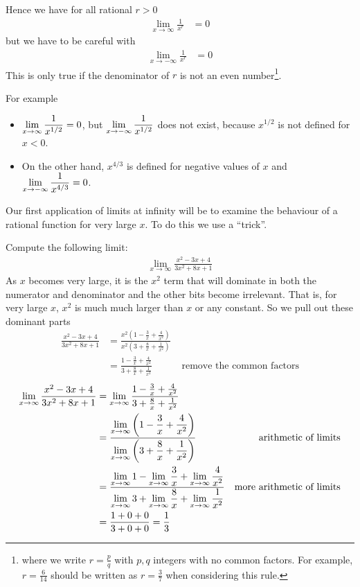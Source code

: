 Hence we have for all rational $r>0$
\begin{align*}
  \lim_{x \to \infty} \frac{1}{x^r} &= 0
\end{align*}
but we have to be careful with
\begin{align*}
  \lim_{x \to -\infty} \frac{1}{x^r} &= 0
\end{align*}
This is only true if the denominator of $r$ is not an even
number\footnote{where we write $r = \frac{p}{q}$ with $p,q$ integers with no
common factors. For example,  $r = \frac{6}{14}$ should be written as $r =
\frac{3}{7}$ when considering this rule.}.

For example
\begin{itemize}
 \item $\displaystyle \lim_{x \to \infty} \frac{1}{x^{1/2}} = 0$, but $\displaystyle \lim_{x \to
-\infty} \frac{1}{x^{1/2}}$ does not exist, because $x^{1/2}$ is not defined for
$x<0$.
\item On the other hand, $x^{4/3}$ is defined for negative values of $x$
and $\displaystyle \lim_{x \to -\infty} \frac{1}{x^{4/3}} = 0$.
\end{itemize}

Our first application of limits at infinity will be to examine the behaviour of
a rational function for very large $x$. To do this we use a ``trick''.
\begin{eg}\label{eg_1_5_2}
Compute the following limit:
\begin{align*}
\lim_{x \to \infty} \frac{x^2-3x+4}{3x^2+8x+1}
\end{align*}
As $x$ becomes very  large, it is the $x^2$ term that will dominate in both the
numerator and denominator and the other bits become irrelevant. That is,
for very large $x$, $x^2$ is much much larger than $x$ or any constant. So we
pull out these dominant parts
\begin{align*}
  \frac{x^2-3x+4}{3x^2+8x+1}
  &= \frac{x^2 \left(1-\frac{3}{x}+\frac{4}{x^2}\right)}
  {x^2 \left(3+\frac{8}{x}+\frac{1}{x^2} \right)}\\
  &= \frac{1-\frac{3}{x}+\frac{4}{x^2}}
  {3+\frac{8}{x}+\frac{1}{x^2}} & \text{ remove the common factors}
\end{align*}
\begin{align*}
  \lim_{x \to \infty} \frac{x^2-3x+4}{3x^2+8x+1}
  &= \lim_{x \to \infty} \frac{1-\frac{3}{x}+\frac{4}{x^2}}
  {3+\frac{8}{x}+\frac{1}{x^2}}\\
  &= \frac{\displaystyle \lim_{x \to \infty}\left(1-\frac{3}{x}+\frac{4}{x^2}\right)}
{\displaystyle \lim_{x \to \infty}\left(3+\frac{8}{x}+\frac{1}{x^2} \right)}
& \text{arithmetic of limits} \\
  &= \frac{\displaystyle \lim_{x \to \infty} 1
  - \lim_{x \to \infty} \frac{3}{x} + \lim_{x \to \infty} \frac{4}{x^2}}
{\displaystyle \lim_{x \to \infty} 3
 + \lim_{x \to \infty} \frac{8}{x}+ \lim_{x \to \infty} \frac{1}{x^2} }
& \text{more arithmetic of limits} \\
  &= \frac{1+0+0}{3+0+0}  = \frac{1}{3}
\end{align*}
\end{eg}

